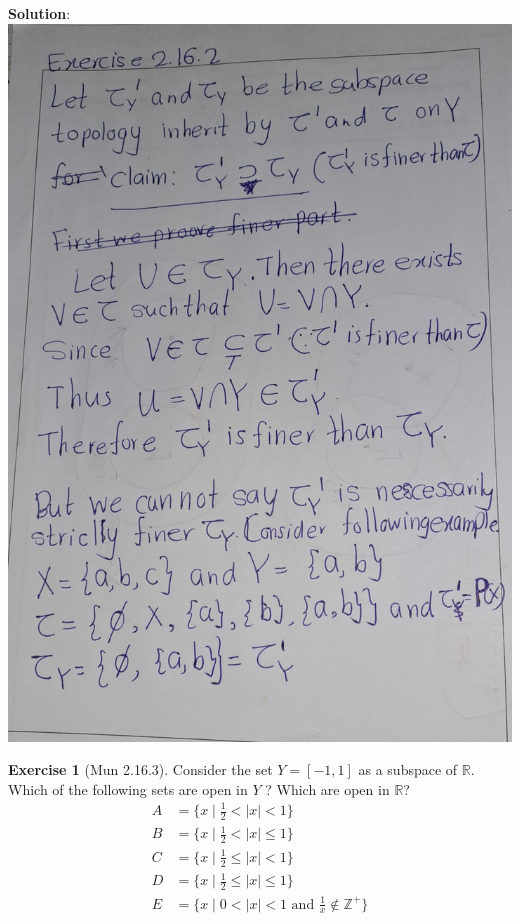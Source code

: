 \documentclass[
]{book}
\theoremstyle{definition}
\theoremstyle{definition}
\theoremstyle{definition}
\newtheorem{exercise}{Exercise}[chapter]
\theoremstyle{definition}
\theoremstyle{remark}
\begin{document}
\textbf{Solution}:
\includegraphics{figures/Exercises/Ex 2.16/ex-2.jpg}

\begin{exercise}[Mun 2.16.3]
\protect\hypertarget{exr:unnamed-chunk-95}{}\label{exr:unnamed-chunk-95}Consider the set \(Y = [−1, 1]\) as a subspace of \(\mathbb{R}\). Which of the following sets are open in \(Y\) ? Which are open in \(\mathbb{R}\)?
\begin{align}
A &= \{ x \mid \frac{1}{2} < |x| < 1 \}\\ 
B &= \{ x \mid \frac{1}{2} < |x| \leq 1 \} \\
C &= \{ x \mid \frac{1}{2} \leq |x| < 1 \}\\
D &= \{ x \mid \frac{1}{2} \leq |x| \leq 1 \}\\
E &= \{ x \mid 0 < |x| < 1 \text{ and } \frac{1}{x} \notin \mathbb{Z}^+ \}
\end{align}
\end{exercise}
\end{document}
